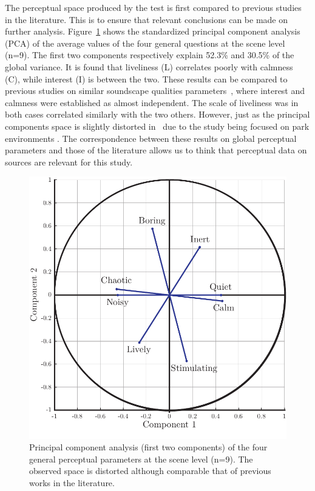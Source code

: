 \documentclass{article}
\begin{document}
\begin{sloppy}
The perceptual space produced by the test is first compared to previous studies in the literature. This is to ensure that relevant conclusions can be made on further analysis. Figure~\ref{fig:pca} shows the standardized principal component analysis (PCA) of the average values of the four general questions at the scene level (n=9). The first two components respectively explain 52.3\% and 30.5\% of the global variance. It is found that liveliness (L) correlates poorly with calmness (C), while interest (I) is between the two. These results can be compared to previous studies on similar soundscape qualities parameters~\cite{axelsson2010, cain2013, jeon2018}, where interest and calmness were established as almost independent. The scale of liveliness was in both cases correlated similarly with the two others. However, just as the principal components space is slightly distorted in~\cite{jeon2018} due to the study being focused on park environments%
. The correspondence between these results on global perceptual parameters and those of the literature allows us to think that perceptual data on sources are relevant for this study.

\begin{figure}[t]
  \centering
  \centerline{\includegraphics[width=0.8\columnwidth]{pca.pdf}}
  \caption{Principal component analysis (first two components) of the four general perceptual parameters at the scene level (n=9). The observed space is distorted although comparable that of previous works in the literature.}
  \label{fig:pca}
\end{figure}


\end{sloppy}
\end{document}
